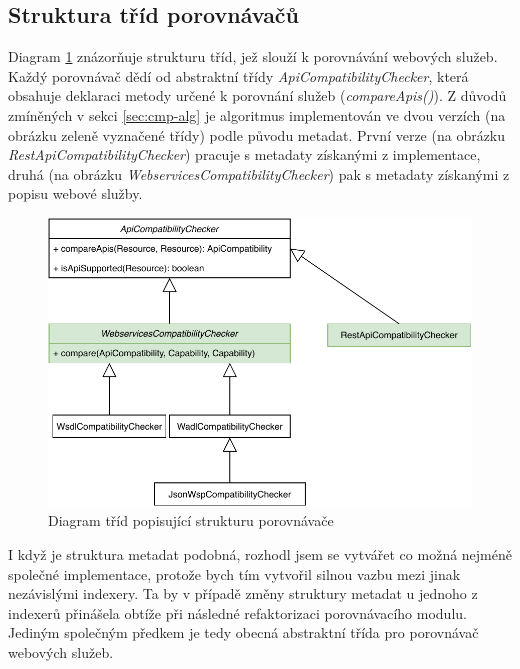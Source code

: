 \documentclass[czech,DP]{thesiskiv}
\begin{document}
\subsection{Struktura tříd porovnávačů}

Diagram \ref{fig:cmp-uml-class} znázorňuje strukturu tříd, jež slouží k porovnávání webových služeb. Každý porovnávač dědí od abstraktní třídy \textit{ApiCompatibilityChecker}, která obsahuje deklaraci metody určené k porovnání služeb (\textit{compareApis()}). Z důvodů zmíněných v sekci \ref{sec:cmp-alg} je algoritmus implementován ve dvou verzích (na obrázku zeleně vyznačené třídy) podle původu metadat. První verze (na obrázku \textit{RestApiCompatibilityChecker}) pracuje s metadaty získanými z implementace, druhá (na obrázku \textit{WebservicesCompatibilityChecker}) pak s metadaty získanými z popisu webové služby.


\begin{figure}[h]
	\centering
		\includegraphics[width=\linewidth]{cmp-uml-class}
	\caption{Diagram tříd popisující strukturu porovnávače}
	\label{fig:cmp-uml-class}
\end{figure}

I když je struktura metadat podobná, rozhodl jsem se vytvářet co možná nejméně společné implementace, protože bych tím vytvořil silnou vazbu mezi jinak nezávislými indexery. Ta by v případě změny struktury metadat u jednoho z indexerů přinášela obtíže při následné refaktorizaci porovnávacího modulu. Jediným společným předkem je tedy obecná abstraktní třída pro porovnávač webových služeb.
\end{document}
